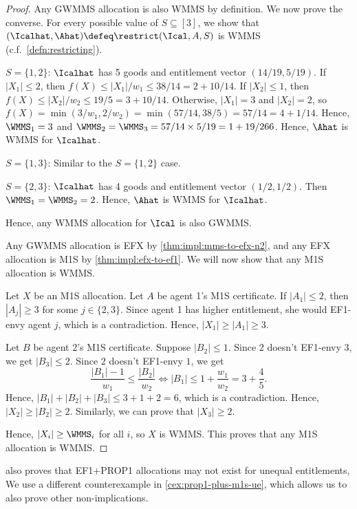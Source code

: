 \begin{proof}
Any GWMMS allocation is also WMMS by definition. We now prove the converse.
For every possible value of $S \subseteq [3]$,
we show that $(\Icalhat, \Ahat) \defeq \restrict(\Ical, A, S)$ is WMMS
(c.f.~\cref{defn:restricting}).
\begin{tightenum}
\item $S = \{1, 2\}$:
    $\Icalhat$ has 5 goods and entitlement vector $(14/19, 5/19)$.
    If $|X_1| \le 2$, then $f(X) \le |X_1|/w_1 \le 38/14 = 2 + 10/14$.
    If $|X_2| \le 1$, then $f(X) \le |X_2|/w_2 \le 19/5 = 3 + 10/14$.
    Otherwise, $|X_1| = 3$ and $|X_2| = 2$, so $f(X) = \min(3/w_1, 2/w_2) = \min(57/14, 38/5) = 57/14 = 4 + 1/14$.
    Hence, $\WMMS_1 = 3$ and $\WMMS_2 = \WMMS_3 = 57/14 \times 5/19 = 1 + 19/266$.
    Hence, $\Ahat$ is WMMS for $\Icalhat$.
\item $S = \{1, 3\}$:
    Similar to the $S = \{1, 2\}$ case.
\item $S = \{2, 3\}$:
    $\Icalhat$ has 4 goods and entitlement vector $(1/2, 1/2)$.
    Then $\WMMS_1 = \WMMS_2 = 2$.
    Hence, $\Ahat$ is WMMS for $\Icalhat$.
\end{tightenum}
Hence, any WMMS allocation for $\Ical$ is also GWMMS.

Any GWMMS allocation is EFX by \cref{thm:impl:mms-to-efx-n2},
and any EFX allocation is M1S by \cref{thm:impl:efx-to-ef1}.
We will now show that any M1S allocation is WMMS.

Let $X$ be an M1S allocation.
Let $A$ be agent 1's M1S certificate.
If $|A_1| \le 2$, then $|A_j| \ge 3$ for some $j \in \{2, 3\}$.
Since agent 1 has higher entitlement, she would EF1-envy agent $j$,
which is a contradiction. Hence, $|X_1| \ge |A_1| \ge 3$.

Let $B$ be agent 2's M1S certificate.
Suppose $|B_2| \le 1$. Since $2$ doesn't EF1-envy $3$, we get $|B_3| \le 2$.
Since $2$ doesn't EF1-envy $1$, we get
\[ \frac{|B_1|-1}{w_1} \le \frac{|B_2|}{w_2} \iff |B_1| \le 1 + \frac{w_1}{w_2} = 3 + \frac{4}{5}. \]
Hence, $|B_1| + |B_2| + |B_3| \le 3 + 1 + 2 = 6$, which is a contradiction.
Hence, $|X_2| \ge |B_2| \ge 2$.
Similarly, we can prove that $|X_3| \ge 2$.

Hence, $|X_i| \ge \WMMS_i$ for all $i$, so $X$ is WMMS.
This proves that any M1S allocation is WMMS.
\end{proof}

\cite{chakraborty2021weighted} also proves that EF1+PROP1 allocations may not exist for unequal entitlements,
We use a different counterexample in \cref{cex:prop1-plus-m1s-ue},
which allows us to also prove other non-implications.


